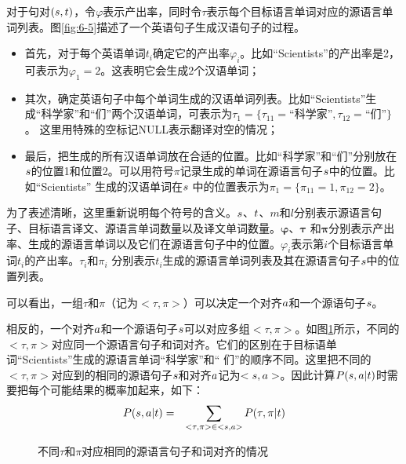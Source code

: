 \parinterval 对于句对$({s},{t})$，令$\varphi$表示产出率，同时令${\tau}$表示每个目标语言单词对应的源语言单词列表。图{\ref{fig:6-5}}描述了一个英语句子生成汉语句子的过程。

\begin{itemize}
\vspace{0.3em}
\item 首先，对于每个英语单词$t_i$确定它的产出率$\varphi_{i}$。比如“Scientists”的产出率是2，可表示为${\varphi}_{1}=2$。这表明它会生成2个汉语单词；
\vspace{0.3em}
\item 其次，确定英语句子中每个单词生成的汉语单词列表。比如“Scientists”生成“科学家”和“们”两个汉语单词，可表示为${\tau}_1=\{{\tau}_{11}=\textrm{“科学家”},{\tau}_{12}=\textrm{“们”}\}$。 这里用特殊的空标记NULL表示翻译对空的情况；
\vspace{0.3em}
\item 最后，把生成的所有汉语单词放在合适的位置。比如“科学家”和“们”分别放在${s}$的位置1和位置2。可以用符号$\pi$记录生成的单词在源语言句子${s}$中的位置。比如“Scientists” 生成的汉语单词在${s}$ 中的位置表示为${\pi}_{1}=\{{\pi}_{11}=1,{\pi}_{12}=2\}$。
\end{itemize}

\parinterval 为了表述清晰，这里重新说明每个符号的含义。${s}$、${t}$、$m$和$l$分别表示源语言句子、目标语言译文、源语言单词数量以及译文单词数量。$\mathbf{\varphi}$、$\mathbf{\tau}$ 和$\mathbf{\pi}$分别表示产出率、生成的源语言单词以及它们在源语言句子中的位置。${\varphi}_{i}$表示第$i$个目标语言单词$t_i$的产出率。${\tau}_{i}$和${\pi}_i$ 分别表示$t_i$生成的源语言单词列表及其在源语言句子${s}$中的位置列表。

\parinterval 可以看出，一组$\tau$和$\pi$（记为$<\tau,\pi>$）可以决定一个对齐${a}$和一个源语句子${s}$。

\noindent 相反的，一个对齐${a}$和一个源语句子${s}$可以对应多组$<\tau,\pi>$。如图\ref{fig:6-6}所示，不同的$<\tau,\pi>$对应同一个源语言句子和词对齐。它们的区别在于目标语单词“Scientists”生成的源语言单词“科学家”和“ 们”的顺序不同。这里把不同的$<\tau,\pi>$对应到的相同的源语句子${s}$和对齐${a}$记为$<{s},{a}>$。因此计算${P}({s},{a}| {t})$时需要把每个可能结果的概率加起来，如下：
\begin{eqnarray}
{P}({s},{a}| {t}) & = & \sum_{{<\tau,\pi>}\in{<{s},{a}>}}{{P}(\tau,\pi|{t}) }
\label{eq:6-9}
\end{eqnarray}

\begin{figure}[htp]
    \centering

   \caption{不同$\tau$和$\pi$对应相同的源语言句子和词对齐的情况}
   \label{fig:6-6}
\end{figure}


